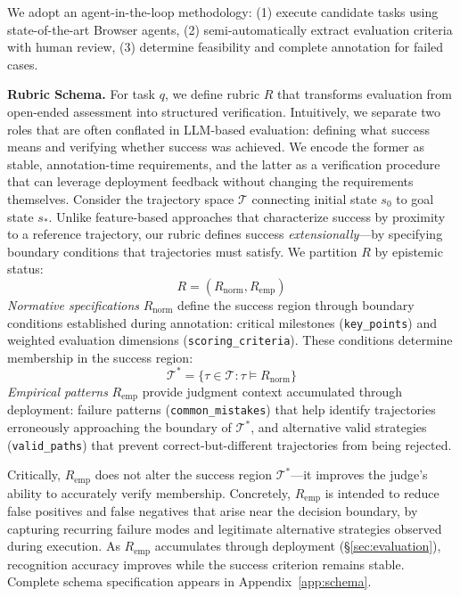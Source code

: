 We adopt an agent-in-the-loop methodology: (1) execute candidate tasks using state-of-the-art Browser agents, (2) semi-automatically extract evaluation criteria with human review, (3) determine feasibility and complete annotation for failed cases.

\textbf{Rubric Schema.} For task $q$, we define rubric $R$ that transforms evaluation from open-ended assessment into structured verification.
Intuitively, we separate two roles that are often conflated in LLM-based evaluation: defining what success means and verifying whether success was achieved. We encode the former as stable, annotation-time requirements, and the latter as a verification procedure that can leverage deployment feedback without changing the requirements themselves.
Consider the trajectory space $\mathcal{T}$ connecting initial state $s_0$ to goal state $s_*$. Unlike feature-based approaches that characterize success by proximity to a reference trajectory, our rubric defines success \textit{extensionally}---by specifying boundary conditions that trajectories must satisfy. We partition $R$ by epistemic status:
\begin{equation}
R = (R_{\text{norm}}, R_{\text{emp}})
\label{eq:rubric_partition_dataset}
\end{equation}
\textit{Normative specifications} $R_{\text{norm}}$ define the success region through boundary conditions established during annotation: critical milestones (\texttt{key\_points}) and weighted evaluation dimensions (\texttt{scoring\_criteria}). These conditions determine membership in the success region:
\begin{equation}
\mathcal{T}^* = \{\tau \in \mathcal{T} : \tau \models R_{\text{norm}}\}
\label{eq:success_region_dataset}
\end{equation}
\textit{Empirical patterns} $R_{\text{emp}}$ provide judgment context accumulated through deployment: failure patterns (\texttt{common\_mistakes}) that help identify trajectories erroneously approaching the boundary of $\mathcal{T}^*$, and alternative valid strategies (\texttt{valid\_paths}) that prevent correct-but-different trajectories from being rejected.

Critically, $R_{\text{emp}}$ does not alter the success region $\mathcal{T}^*$---it improves the judge's ability to accurately verify membership.
Concretely, $R_{\text{emp}}$ is intended to reduce false positives and false negatives that arise near the decision boundary, by capturing recurring failure modes and legitimate alternative strategies observed during execution.
As $R_{\text{emp}}$ accumulates through deployment (\S\ref{sec:evaluation}), recognition accuracy improves while the success criterion remains stable. Complete schema specification appears in Appendix~\ref{app:schema}.
